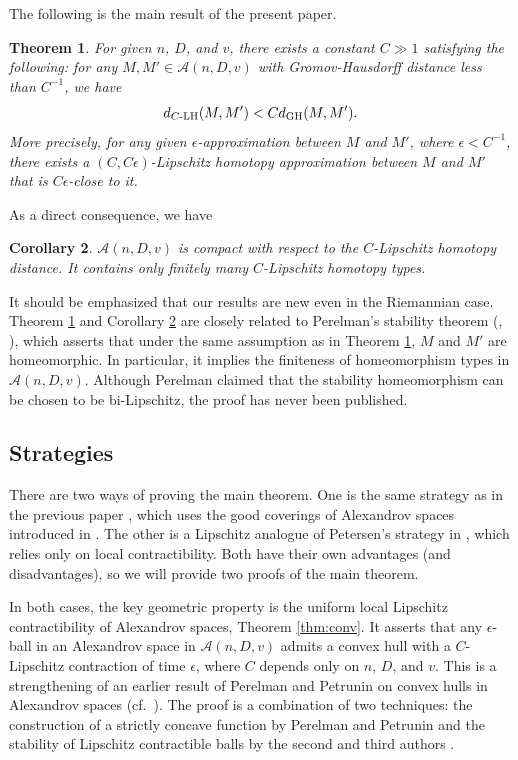 \documentclass[a4paper,12pt]{amsart}
\theoremstyle{plain}
\newtheorem{thm}{Theorem}
\newtheorem{cor}[thm]{Corollary}
\theoremstyle{definition}
\numberwithin{thm}{section}
\numberwithin{equation}{section}
\begin{document}
The following is the main result of the present paper.

\begin{thm}\label{thm:main}
For given $n$, $D$, and $v$, there exists a constant $C\gg 1$ satisfying the following:
for any $M,M'\in\mathcal A(n,D,v)$ with Gromov-Hausdorff distance less than $C^{-1}$, we have
\[d_{C\mathchar`-\mathrm{LH}}(M,M')<Cd_\mathrm{GH}(M,M').\]
More precisely, for any given $\epsilon$-approximation between $M$ and $M'$, where $\epsilon<C^{-1}$, there exists a $(C,C\epsilon)$-Lipschitz homotopy approximation between $M$ and $M'$ that is $C\epsilon$-close to it.
\end{thm}

As a direct consequence, we have 

\begin{cor}\label{cor:main}
$\mathcal A(n,D,v)$ is compact with respect to the $C$-Lipschitz homotopy distance.
It contains only finitely many $C$-Lipschitz homotopy types.
\end{cor}

It should be emphasized that our results are new even in the Riemannian case.
Theorem \ref{thm:main} and Corollary \ref{cor:main} are closely related to Perelman's stability theorem (\cite{Per:alex}, \cite{K:stab}), which asserts that under the same assumption as in Theorem \ref{thm:main}, $M$ and $M'$ are homeomorphic.
In particular, it implies the finiteness of homeomorphism types in $\mathcal A(n,D,v)$.
Although Perelman claimed that the stability homeomorphism can be chosen to be bi-Lipschitz, the proof has never been published.

\subsection{Strategies}

There are two ways of proving the main theorem.
One is the same strategy as in the previous paper \cite{MY:lip}, which uses the good coverings of Alexandrov spaces introduced in \cite{MY:good}.
The other is a Lipschitz analogue of Petersen's strategy in \cite{Peter}, which relies only on local contractibility.
Both have their own advantages (and disadvantages), so we will provide two proofs of the main theorem.

In both cases, the key geometric property is the uniform local Lipschitz contractibility of Alexandrov spaces, Theorem \ref{thm:conv}.
It asserts that any $\epsilon$-ball in an Alexandrov space in $\mathcal A(n,D,v)$ admits a convex hull with a $C$-Lipschitz contraction of time $\epsilon$, where $C$ depends only on $n$, $D$, and $v$.
This is a strengthening of an earlier result of Perelman and Petrunin \cite[4.3]{PP:ext} on convex hulls in Alexandrov spaces (cf.\ \cite[7.1.3]{Pet:sc}).
The proof is a combination of two techniques: the construction of a strictly concave function by Perelman and Petrunin \cite[4.3]{PP:ext} and the stability of Lipschitz contractible balls by the second and third authors \cite[1.2]{MY:stab}.
\end{document}
